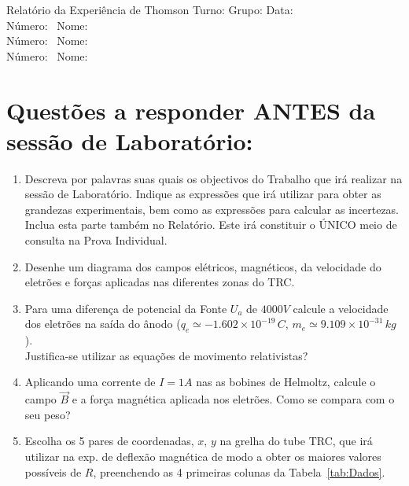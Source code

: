 \documentclass[a4paper,12pt]{article}  %
\author{Prof. Bernardo B. Carvalho}
\date{ Outubro 2014}
\newcommand{\HRule}{\rule{\linewidth}{0.5mm}}
\begin{document}
 



{  \sf  Relatório da Experiência de Thomson} %
Turno:\underline{\makebox[0.7cm][l]{~}} Grupo:\underline{\makebox[0.7cm][l]{~}} Data:\underline{\makebox[2cm][l]{~}}\\
\noindent Número:~\underline{\makebox[2cm][r]{~}} Nome:~\underline{\makebox[10cm][r]{~}} \\
\noindent Número:~\underline{\makebox[2cm][r]{~}} Nome:~\underline{\makebox[10cm][r]{~}} \\
\noindent Número:~\underline{\makebox[2cm][r]{~}} Nome:~\underline{\makebox[10cm][r]{~}} 


\section{\sf Questões a responder ANTES da sessão de Laboratório:}
\begin{enumerate}
\item Descreva por palavras suas quais os objectivos do Trabalho que irá realizar na sessão de Laboratório. Indique as expressões que irá utilizar para obter as grandezas experimentais, bem como as expressões para calcular as incertezas. Inclua esta parte também no Relatório. Este irá constituir o ÚNICO meio de consulta na Prova Individual.
\item Desenhe um diagrama dos campos elétricos, magnéticos, da velocidade do eletrões e forças aplicadas nas diferentes zonas do TRC.
\item Para uma diferença de potencial da Fonte $U_a$  de $4000 V$ calcule a velocidade dos eletrões na saída do ânodo ($q_e \simeq  −1.602×10^{−19}\, C$, $m_e\simeq 9.109×10^{−31}\, kg$). \\
Justifica-se utilizar as equações de movimento relativistas?
\item Aplicando uma corrente de $I= 1A$ nas as bobines de Helmoltz, calcule o campo $\vec{B}$ e a força magnética aplicada nos eletrões. Como se compara com o seu peso? 
\item Escolha os 5 pares de coordenadas, $x,\, y$ na grelha  do tube TRC,  que irá utilizar na exp. de deflexão magnética de modo a obter os maiores valores possíveis de $R$, preenchendo as 4 primeiras colunas da Tabela~\ref{tab:Dados}.
\end{enumerate}
\end{document}
